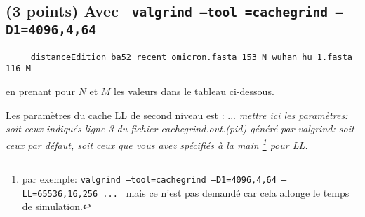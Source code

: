 \documentclass[10pt,a4paper]{article}
\begin{document}
\subsection{(3 points) Avec {\tt 
	valgrind --tool =cachegrind --D1=4096,4,64
}} 
\begin{verbatim}
     distanceEdition ba52_recent_omicron.fasta 153 N wuhan_hu_1.fasta 116 M 
\end{verbatim}
en prenant pour $N$ et $M$ les valeurs dans le tableau ci-dessous.


Les paramètres du cache LL de second niveau est : ...
{\em mettre ici les paramètres: soit ceux indiqués ligne 3
du fichier cachegrind.out.(pid) généré par valgrind: soit ceux par défaut,
soit ceux que vous avez spécifiés à la main
\footnote{par exemple:
{\tt valgrind --tool=cachegrind --D1=4096,4,64 --LL=65536,16,256  ... }
mais ce n'est pas demandé car cela allonge le temps de simulation. } 
 pour LL. }
\end{document}
